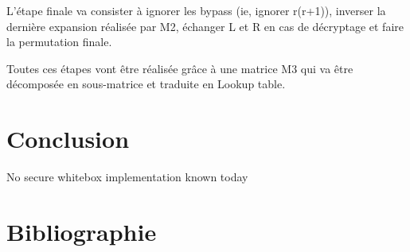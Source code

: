 \documentclass[a4paper,12pt]{article}
\begin{document}
L'étape finale va consister à ignorer les bypass (ie, ignorer r(r+1)), inverser la dernière expansion réalisée par M2, échanger L et R en cas de décryptage et faire la permutation finale.

Toutes ces étapes vont être réalisée grâce à une matrice M3 qui va être décomposée en sous-matrice et traduite en Lookup table.
\section{Conclusion}

No secure whitebox implementation known today

\newpage
\section{Bibliographie}
\end{document}
